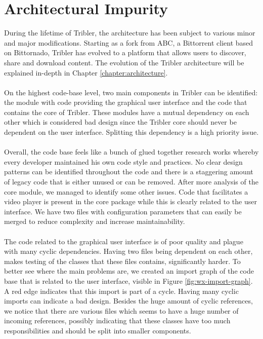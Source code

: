 \section{Architectural Impurity}
During the lifetime of Tribler, the architecture has been subject to various minor and major modifications. Starting as a fork from ABC, a Bittorrent client based on Bittornado, Tribler has evolved to a platform that allows users to discover, share and download content. The evolution of the Tribler architecture will be explained in-depth in Chapter \ref{chapter:architecture}.\\\\
On the highest code-base level, two main components in Tribler can be identified: the module with code providing the graphical user interface and the code that contains the core of Tribler. These modules have a mutual dependency on each other which is considered bad design since the Tribler core should never be dependent on the user interface. Splitting this dependency is a high priority issue.\\\\
Overall, the code base feels like a bunch of glued together research works whereby every developer maintained his own code style and practices. No clear design patterns can be identified throughout the code and there is a staggering amount of legacy code that is either unused or can be removed. After more analysis of the core module, we managed to identify some other issues. Code that facilitates a video player is present in the core package while this is clearly related to the user interface. We have two files with configuration parameters that can easily be merged to reduce complexity and increase maintainability.\\\\
The code related to the graphical user interface is of poor quality and plague with many cyclic dependencies. Having two files being dependent on each other, makes testing of the classes that these files contains, significantly harder. To better see where the main problems are, we created an import graph of the code base that is related to the user interface, visible in Figure \ref{fig:wx-import-graph}. A red edge indicates that this import is part of a cycle. Having many cyclic imports can indicate a bad design. Besides the huge amount of cyclic references, we notice that there are various files which seems to have a huge number of incoming references, possibly indicating that these classes have too much responsibilities and should be split into smaller components.\\\\


